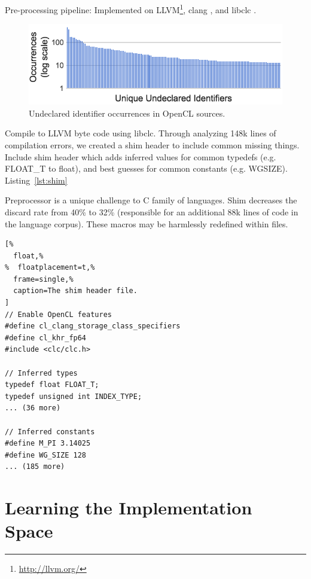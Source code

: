 \documentclass[preprint,nonatbib,10pt,nocopyrightspace]{sigplanconf}
\begin{document}
Pre-processing pipeline: Implemented on
LLVM\footnote{\url{http://llvm.org/}},
clang%
, and libclc%
.

\begin{figure}%
\includegraphics[width=\columnwidth]{img/undeclared-identifiers.png}
\caption{%
  Undeclared identifier occurrences in OpenCL sources.
}
\end{figure}

Compile to LLVM byte code using libclc. Through analyzing 148k lines of
compilation errors, we created a shim header to include common missing
things. Include shim header which adds inferred values for common
typedefs (e.g. FLOAT\_T to float), and best guesses for common
constants (e.g. WGSIZE). Listing~\ref{lst:shim}

Preprocessor is a unique challenge to C family of languages. Shim
decreases the discard rate from 40\% to 32\% (responsible for an
additional 88k lines of code in the language corpus). These macros may
be harmlessly redefined within files.

\lstset{language=[OpenCL]C}
\begin{lstlisting}[%
  float,%
%  floatplacement=t,%
  frame=single,%
  caption=The shim header file.
]
// Enable OpenCL features
#define cl_clang_storage_class_specifiers
#define cl_khr_fp64
#include <clc/clc.h>

// Inferred types
typedef float FLOAT_T;
typedef unsigned int INDEX_TYPE;
... (36 more)

// Inferred constants
#define M_PI 3.14025
#define WG_SIZE 128
... (185 more)
\end{lstlisting}

\section{Learning the Implementation Space}\label{sec:ml}
\end{document}
